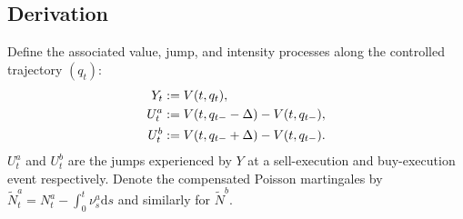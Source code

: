 \documentclass[11pt,a4paper]{article}
\theoremstyle{definition}
\theoremstyle{remark}
\newcommand{\dd}{\mathrm{d}}
\newcommand{\Nt}{\widetilde{N}}
\begin{document}
\subsection{Derivation}

Define the associated value, jump, and intensity processes along
the controlled trajectory $(q_t)$:
\begin{align}\label{eq:YUnu-def}
Y_t &:= V(t, q_t), \notag\\
U^a_t &:= V(t, q_{t-} - \Delta) - V(t, q_{t-}), \notag\\
U^b_t &:= V(t, q_{t-} + \Delta) - V(t, q_{t-}).
\end{align}
$U^a_t$ and $U^b_t$ are the jumps experienced by $Y$ at a
sell-execution and buy-execution event respectively.  Denote the
compensated Poisson martingales by
$\Nt^a_t = N^a_t - \int_0^t \nu^a_s \dd s$ and similarly for
$\Nt^b$.
\end{document}
